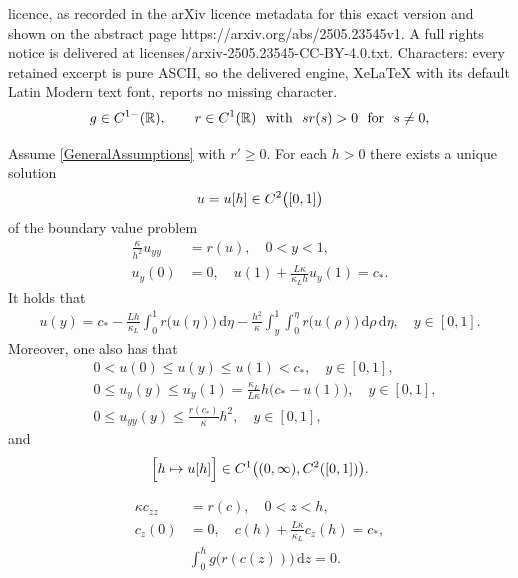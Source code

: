 \documentclass[10pt,a4paper]{amsart}
\newcommand{\R}{\mathbb{R}}
\newcommand{\rd}{\mathrm{d}}
\begin{document}
licence, as recorded in the arXiv licence metadata for this exact version and shown on the abstract page https://arxiv.org/abs/2505.23545v1. A full rights notice is delivered at licenses/arxiv-2505.23545-CC-BY-4.0.txt. Characters: every retained excerpt is pure ASCII, so the delivered engine, XeLaTeX with its default Latin Modern text font, reports no missing character.
\begin{equation}\label{GeneralAssumptions}
g\in {\rm C}^{1-}(\R), \qquad r\in
{\rm C}^{1}(\R)\ \text{ with }\ sr(s)> 0\ \text{ for }\ s\not= 0,
\end{equation}

\begin{prop}\label{P1}
Assume \eqref{GeneralAssumptions} with $r'\ge 0$. For each $h>0$ there exists a
unique solution $$u=u[h]\in {\rm C}^2 \bigl( [0,1]\bigr)$$ of the
boundary value problem
\begin{subequations}\label{BBBB}
\begin{align}
\frac{\kappa}{h^2} u_{yy}&= r(u),\quad  0<y<1,\label{BBBB1}\\
u_y(0)&=0,\quad u(1)+\frac{L\kappa}{\kappa_L h}u_y(1)=c_*.\label{BBBB2}
\end{align}
\end{subequations}
It holds that
\begin{align}\label{C}
  u(y)=c_*-\frac{Lh}{\kappa_L}\int_0^1
  r \bigl( u(\eta)\bigr)\,\rd \eta-\frac{h^2}{\kappa}
  \int_y^1\int_0^\eta r \bigl( u(\rho)\bigr)\,\rd\rho \,\rd \eta,\quad y\in [0,1].
\end{align}
Moreover, one also has that
\begin{subequations}\label{ccc}
\begin{align}
&0< u(0)\le u(y)\le u(1)< c_*,\quad  y\in [0,1],\label{ccc1}\\
&0\le u_y(y)\le u_y(1)=\frac{\kappa_L}{L\kappa}h \big(c_*-u(1)\big),\quad 
y\in [0,1],\label{ccc2}\\
&0\le u_{yy}(y)\le \frac{r(c_*)}{\kappa}h^2,\quad  y\in [0,1], \label{ccc3}
\end{align}
\end{subequations}
and
$$
\Bigl[ h\mapsto u[h]\Bigr]\in {\rm C}^1\big((0,\infty),
{\rm C}^2([0,1])\big).
$$
\end{prop}

\begin{subequations}\label{BBex}
\begin{align}
\kappa c_{zz}&= r(c),\quad 0<z<h,\label{BBex2}\\
c_z(0)&=0,\quad c(h)+\frac{L\kappa}{\kappa_L}c_z(h)=c_*, \label{BBex4}\\
&\int_0^h g\big(r(c(z))\big)\,\rd z=0. \label{BBex6}
\end{align}
 \end{subequations}
\end{document}
